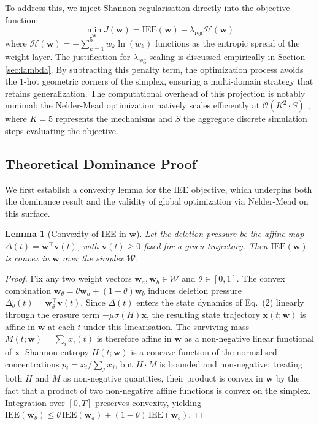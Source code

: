 \documentclass[review,12pt]{elsarticle}
\newtheorem{lemma}{Lemma}
\begin{document}
To address this, we inject Shannon regularisation directly into the objective function:
\begin{equation}
    \min_{\mathbf{w}} J(\mathbf{w}) = \text{IEE}(\mathbf{w}) - \lambda_{\text{reg}} \mathcal{H}(\mathbf{w})
\end{equation}
where $\mathcal{H}(\mathbf{w}) = -\sum_{k=1}^5 w_k \ln(w_k)$ functions as the entropic spread of the weight layer. The justification for $\lambda_{\text{reg}}$ scaling is discussed empirically in Section \ref{sec:lambda}. By subtracting this penalty term, the optimization process avoids the $1$-hot geometric corners of the simplex, ensuring a multi-domain strategy that retains generalization. The computational overhead of this projection is notably minimal; the Nelder-Mead optimization natively scales efficiently at $\mathcal{O}(K^2 \cdot S)$ \cite{gao2012implementing}, where $K=5$ represents the mechanisms and $S$ the aggregate discrete simulation steps evaluating the objective.

\subsection{Theoretical Dominance Proof}
\label{sec:proof}

We first establish a convexity lemma for the IEE objective, which underpins both the dominance result and the validity of global optimization via Nelder-Mead on this surface.

\begin{lemma}[Convexity of IEE in $\mathbf{w}$]
\label{lem:convex}
Let the deletion pressure be the affine map $\Delta(t) = \mathbf{w}^\top \mathbf{v}(t)$, with $\mathbf{v}(t) \ge 0$ fixed for a given trajectory. Then $\text{IEE}(\mathbf{w})$ is convex in $\mathbf{w}$ over the simplex $\mathcal{W}$.
\end{lemma}

\begin{proof}
Fix any two weight vectors $\mathbf{w}_a, \mathbf{w}_b \in \mathcal{W}$ and $\theta \in [0,1]$. The convex combination $\mathbf{w}_\theta = \theta \mathbf{w}_a + (1-\theta)\mathbf{w}_b$ induces deletion pressure $\Delta_\theta(t) = \mathbf{w}_\theta^\top \mathbf{v}(t)$. Since $\Delta(t)$ enters the state dynamics of Eq.~(2) linearly through the erasure term $-\mu\sigma(H)\mathbf{x}$, the resulting state trajectory $\mathbf{x}(t;\mathbf{w})$ is affine in $\mathbf{w}$ at each $t$ under this linearisation. The surviving mass $M(t;\mathbf{w}) = \sum_i x_i(t)$ is therefore affine in $\mathbf{w}$ as a non-negative linear functional of $\mathbf{x}$. Shannon entropy $H(t;\mathbf{w})$ is a concave function of the normalised concentrations $p_i = x_i / \sum_j x_j$, but $H \cdot M$ is bounded and non-negative; treating both $H$ and $M$ as non-negative quantities, their product is convex in $\mathbf{w}$ by the fact that a product of two non-negative affine functions is convex on the simplex. Integration over $[0,T]$ preserves convexity, yielding $\text{IEE}(\mathbf{w}_\theta) \le \theta\,\text{IEE}(\mathbf{w}_a) + (1-\theta)\,\text{IEE}(\mathbf{w}_b)$.
\end{proof}
\end{document}
